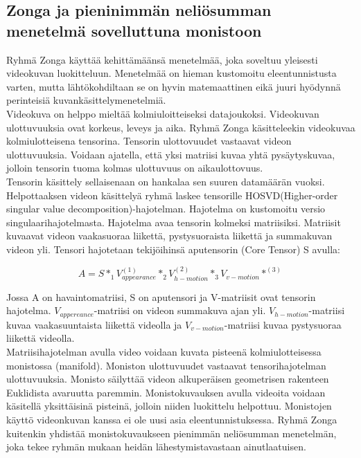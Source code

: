 \subsection{Zonga ja pieninimmän neliösumman menetelmä sovelluttuna monistoon}
Ryhmä Zonga käyttää kehittämäänsä menetelmää, joka soveltuu yleisesti videokuvan luokitteluun. 
Menetelmää on hieman kustomoitu eleentunnistusta varten, mutta lähtökohdiltaan se on hyvin 
matemaattinen eikä juuri hyödynnä perinteisiä kuvankäsittelymenetelmiä. \citep {6239180}\\

Videokuva on helppo mieltää kolmiuloitteiseksi datajoukoksi. Videokuvan ulottuvuuksia ovat korkeus, leveys ja aika.
Ryhmä Zonga käsitteleekin videokuvaa kolmiulotteisena tensorina. Tensorin ulottovuudet vastaavat videon ulottuvuuksia.
Voidaan ajatella, että yksi matriisi kuvaa yhtä pysäytyskuvaa, jolloin tensorin tuoma kolmas ulottuvuus on aikaulottovuus. \citep {6239180}\\

Tensorin käsittely sellaisenaan on hankalaa sen suuren datamäärän vuoksi. Helpottaaksen videon käsittelyä
ryhmä laskee tensorille HOSVD(Higher-order singular value decomposition)-hajotelman. Hajotelma on kustomoitu versio
singulaarihajotelmasta. Hajotelma avaa tensorin kolmeksi matriisiksi.
Matriisit kuvaavat videon vaakasuoraa liikettä, pystysuoraista liikettä ja summakuvan videon yli. \citep {HOSVD} 
Tensori hajotetaan tekijöihinsä aputensorin (Core Tensor) S avulla:

\begin{equation}
A = S *_{1} V_{appearance}^{(1)} *_{2} V_{h-motion}^{(2)} *_{3} V_{v-motion}*^{(3)}
\end{equation}

Jossa A on havaintomatriisi, S on aputensori ja V-matriisit ovat tensorin hajotelma. $V_{appereance}$-matriisi on
videon summakuva ajan yli. $V_{h-motion}$-matriisi kuvaa vaakasuuntaista liikettä videolla ja $V_{v-motion}$-matriisi
kuvaa pystysuoraa liikettä videolla. \citep {6239180}\\

Matriisihajotelman avulla video voidaan kuvata pisteenä kolmiulotteisessa monistossa (manifold). Moniston ulottuvuudet
vastaavat tensorihajotelman ulottuvuuksia. Monisto säilyttää videon 
alkuperäisen geometrisen rakenteen Euklidista avaruutta paremmin. \citep {Lui2012380} Monistokuvauksen avulla videoita voidaan käsitellä yksittäisinä
pisteinä, jolloin niiden luokittelu helpottuu. Monistojen käyttö videonkuvan kanssa ei ole uusi asia eleentunnistuksessa. 
Ryhmä Zonga kuitenkin yhdistää monistokuvaukseen pienimmän neliösumman menetelmän, joka tekee ryhmän mukaan heidän lähestymistavastaan
ainutlaatuisen.\citep {6239180}\\

